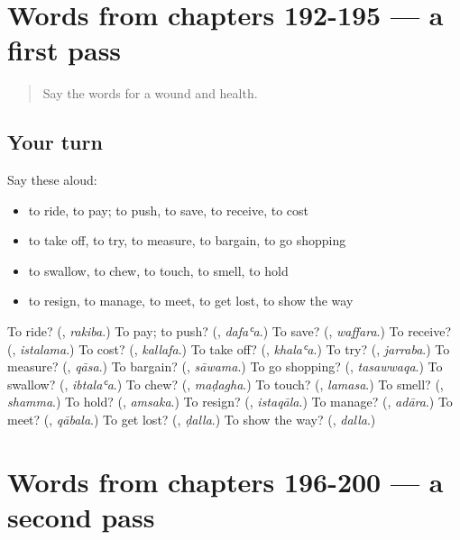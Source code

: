 \section[(dialogue)]{Words from chapters 192-195 — a first pass}

\label{lesson:AR-R200-first-pass-words-from-chapters-192-195}



\begin{quote}
Say the words for a wound and health.
\end{quote}

\subsection*{Your turn}
Say these aloud:

\begin{itemize}
\raggedright
  \item to ride, to pay; to push, to save, to receive, to cost
  \item to take off, to try, to measure, to bargain, to go shopping
  \item to swallow, to chew, to touch, to smell, to hold
  \item to resign, to manage, to meet, to get lost, to show the way
\end{itemize}

\begin{tcolorbox}[breakable,colback=teal!4,colframe=teal!35!black,title={Before you move on}]
To ride? (\textbf{}, \emph{rakiba}.) To pay; to push? (\textbf{}, \emph{dafaʿa}.) To save? (\textbf{}, \emph{waffara}.) To receive? (\textbf{}, \emph{istalama}.) To cost? (\textbf{}, \emph{kallafa}.) To take off? (\textbf{}, \emph{khalaʿa}.) To try? (\textbf{}, \emph{jarraba}.) To measure? (\textbf{}, \emph{qāsa}.) To bargain? (\textbf{}, \emph{sāwama}.) To go shopping? (\textbf{}, \emph{tasawwaqa}.) To swallow? (\textbf{}, \emph{ibtalaʿa}.) To chew? (\textbf{}, \emph{maḍagha}.) To touch? (\textbf{}, \emph{lamasa}.) To smell? (\textbf{}, \emph{shamma}.) To hold? (\textbf{}, \emph{amsaka}.) To resign? (\textbf{}, \emph{istaqāla}.) To manage? (\textbf{}, \emph{adāra}.) To meet? (\textbf{}, \emph{qābala}.) To get lost? (\textbf{}, \emph{ḍalla}.) To show the way? (\textbf{}, \emph{dalla}.)
\end{tcolorbox}
\section[(dialogue)]{Words from chapters 196-200 — a second pass}

